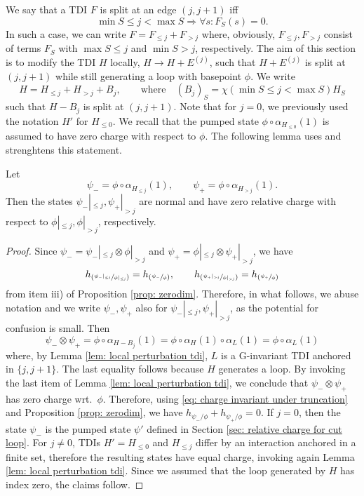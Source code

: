 We say that a TDI $F$ is split at an edge $(j,j+1)$ iff\
$$
\min S \leq j <\max S  \Rightarrow \forall s: F_S(s)=0.
$$
In such a case, we can write $F=F_{\leq j}+F_{>j}$ where, obviously, $F_{\leq j}, F_{>j}$ consist of terms $F_S$ with $\max S\leq j$ and $\min S>j$, respectively. The aim of this section is to modify the TDI $H$ locally, $H \to H+E^{(j)}$, such that $H+E^{(j)}$ is split at $(j,j+1)$  while still generating a loop with basepoint $\phi$.
We write 
$$
H=H_{\leq j}+H_{>j} + B_j,\qquad \text{where}\quad (B_j)_S= \chi( \min S \leq j <\max S)  H_S
$$ 
such that $H-B_j$ is split at $(j,j+1)$. 
Note that for $j=0$, we previously used the notation $H'$ for $H_{\leq 0}$. 
We recall that the pumped state $\phi\circ\alpha_{H_{\leq 0}}(1)$ is assumed to have zero charge with respect to $\phi$. The following lemma uses and strenghtens this statement.
\begin{lemma}\label{lem: zero charge both sides}
	Let 
	$$
	\psi_-=\phi\circ\alpha_{H_{\leq j}}(1), \qquad \psi_+=\phi\circ\alpha_{H_{> j}}(1).
	$$
	Then the states $\psi_-|_{\leq j},\psi_+|_{> j} $ are normal and have zero relative charge with respect to $\phi|_{\leq j},\phi|_{> j} $, respectively. 
\end{lemma}
\begin{proof}
	Since $\psi_-=\psi_-|_{\leq j} \otimes \phi|_{> j}$ and  $\psi_+=\phi|_{\leq j} \otimes \psi_+|_{> j}$, we have  
	\begin{equation}\label{eq: charge invariant under truncation}
	h_{\left(\sfrac{\psi_-|_{\leq j}}{\phi|_{\leq j}}\right)} =  h_{\left(\sfrac{\psi_-}{\phi}\right)},\qquad   h_{\left(\sfrac{\psi_+|_{>j}}{\phi|_{> j}}\right)}=  h_{\left(\sfrac{\psi_+}{\phi}\right)}
	\end{equation}
	from item iii) of Proposition \ref{prop: zerodim}. 
	Therefore, in what follows, we abuse notation and we write $\psi_-,\psi_+ $ also for $\psi_-|_{\leq j},\psi_+|_{> j} $, as the potential for confusion is small. 
	Then
	$$
	\psi_-\otimes\psi_+= \phi\circ \alpha_{H-B_j}(1)= \phi\circ\alpha_{H}(1)\circ   \alpha_L(1)=  \phi  \circ \alpha_L(1)
	$$
	where, by Lemma \ref{lem: local perturbation tdi}, $L$ is a G-invariant TDI anchored in $\{j,j+1\}$. The last equality follows because $H$ generates a loop. By invoking the last item of Lemma \ref{lem: local perturbation tdi}, we conclude that $\psi_- \otimes\psi_+$ has zero charge wrt.\ $\phi$. Therefore, using \eqref{eq: charge invariant under truncation} and Proposition \ref{prop: zerodim}, we have $h_{\psi_-/\phi}+h_{\psi_+/\phi}=0$.  
	If $j=0$, then the state $\psi_-$ is the pumped state $\psi'$ defined in Section \eqref{sec: relative charge for cut loop}. For $j\neq0$, TDIs $H'=H_{\leq 0}$ and $H_{\leq j}$ differ by an interaction anchored in a finite set, therefore the resulting states have equal charge, invoking again Lemma \ref{lem: local perturbation tdi}. Since we assumed that the loop generated by $H$ has index zero, the claims  follow. 
\end{proof}

